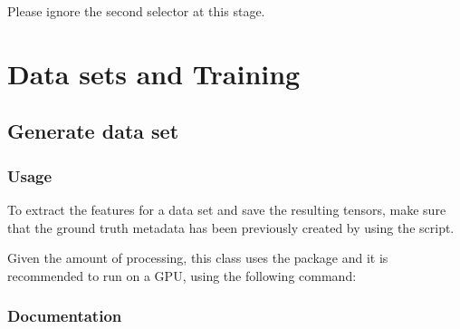 \documentclass[letterpaper,10pt,english]{sphinxmanual}
\begin{document}
Please ignore the second selector at this stage.


\chapter{Data sets and Training}
\label{\detokenize{index:data-sets-and-training}}

\section{Generate data set}
\label{\detokenize{generate_dataset:generate-data-set}}\label{\detokenize{generate_dataset::doc}}

\subsection{Usage}
\label{\detokenize{generate_dataset:usage}}
To extract the features for a data set and save the resulting tensors, make sure that the
ground truth metadata has been previously created by using the  script.

Given the amount of processing, this class uses the  package and it is
recommended to run on a GPU, using the following command:

%
\begin{sphinxVerbatim}[commandchars=\\\{\}]
 
\end{sphinxVerbatim}


\subsection{Documentation}
\label{\detokenize{generate_dataset:documentation}}\label{\detokenize{generate_dataset:module-generate_dataset}}
\end{document}
